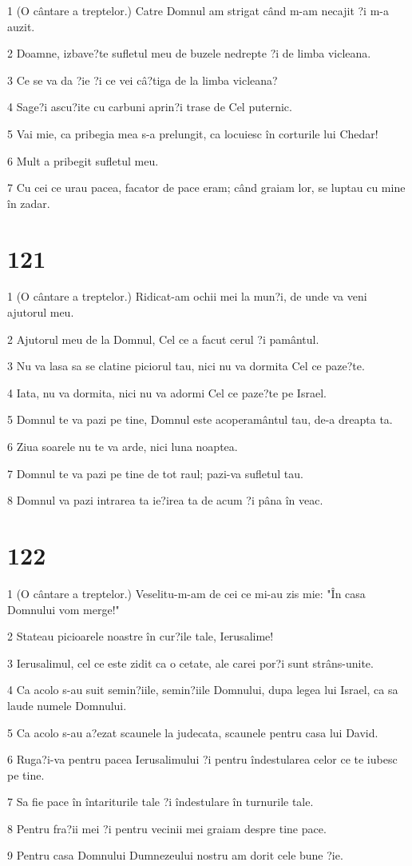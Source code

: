 \par 1 (O cântare a treptelor.) Catre Domnul am strigat când m-am necajit ?i m-a auzit.
\par 2 Doamne, izbave?te sufletul meu de buzele nedrepte ?i de limba vicleana.
\par 3 Ce se va da ?ie ?i ce vei câ?tiga de la limba vicleana?
\par 4 Sage?i ascu?ite cu carbuni aprin?i trase de Cel puternic.
\par 5 Vai mie, ca pribegia mea s-a prelungit, ca locuiesc în corturile lui Chedar!
\par 6 Mult a pribegit sufletul meu.
\par 7 Cu cei ce urau pacea, facator de pace eram; când graiam lor, se luptau cu mine în zadar.

\chapter{121}

\par 1 (O cântare a treptelor.) Ridicat-am ochii mei la mun?i, de unde va veni ajutorul meu.
\par 2 Ajutorul meu de la Domnul, Cel ce a facut cerul ?i pamântul.
\par 3 Nu va lasa sa se clatine piciorul tau, nici nu va dormita Cel ce paze?te.
\par 4 Iata, nu va dormita, nici nu va adormi Cel ce paze?te pe Israel.
\par 5 Domnul te va pazi pe tine, Domnul este acoperamântul tau, de-a dreapta ta.
\par 6 Ziua soarele nu te va arde, nici luna noaptea.
\par 7 Domnul te va pazi pe tine de tot raul; pazi-va sufletul tau.
\par 8 Domnul va pazi intrarea ta ie?irea ta de acum ?i pâna în veac.

\chapter{122}

\par 1 (O cântare a treptelor.) Veselitu-m-am de cei ce mi-au zis mie: "În casa Domnului vom merge!"
\par 2 Stateau picioarele noastre în cur?ile tale, Ierusalime!
\par 3 Ierusalimul, cel ce este zidit ca o cetate, ale carei por?i sunt strâns-unite.
\par 4 Ca acolo s-au suit semin?iile, semin?iile Domnului, dupa legea lui Israel, ca sa laude numele Domnului.
\par 5 Ca acolo s-au a?ezat scaunele la judecata, scaunele pentru casa lui David.
\par 6 Ruga?i-va pentru pacea Ierusalimului ?i pentru îndestularea celor ce te iubesc pe tine.
\par 7 Sa fie pace în întariturile tale ?i îndestulare în turnurile tale.
\par 8 Pentru fra?ii mei ?i pentru vecinii mei graiam despre tine pace.
\par 9 Pentru casa Domnului Dumnezeului nostru am dorit cele bune ?ie.

